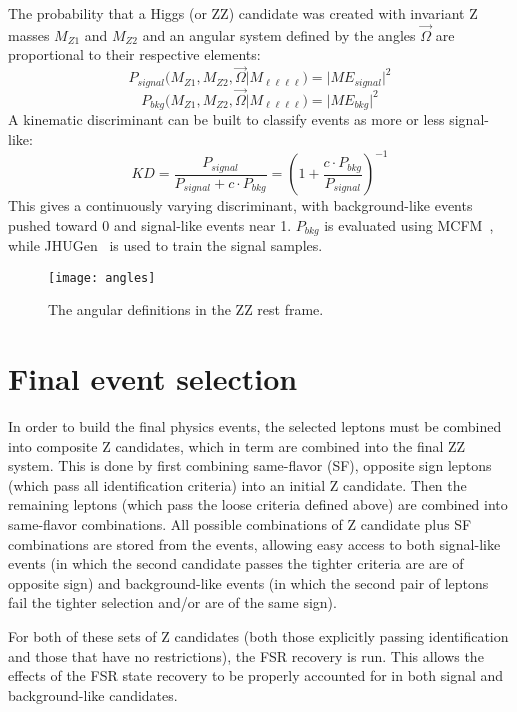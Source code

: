 The probability that a Higgs (or ZZ) candidate was created with invariant Z
masses $M_{Z1}$ and $M_{Z2}$ and an angular system defined by the angles $\vec
\Omega$ are proportional to their respective elements:
\begin{equation}
    P_{signal} (M_{Z1}, M_{Z2}, \vec \Omega | M_{\ell\ell\ell\ell} ) = |
    ME_{signal} |^2
\end{equation}
\begin{equation}
    P_{bkg} (M_{Z1}, M_{Z2}, \vec \Omega | M_{\ell\ell\ell\ell} ) = |
    ME_{bkg} |^2
\end{equation}
A kinematic discriminant can be built to classify events as more or less
signal-like:
\begin{equation}
    KD = \frac{P_{signal}}{P_{signal}+c\cdot P_{bkg}} = \left(1+\frac{c\cdot
    P_{bkg}}{P_{signal}} \right)^{-1}
\end{equation}
This gives a continuously varying discriminant, with background-like events
pushed toward 0 and signal-like events near 1.
$P_{bkg}$ is evaluated using MCFM~\cite{MCFM}, while JHUGen~\cite{spin} is used to train
the signal samples.

\begin{figure}[h]
\centering
\texttt{[image: angles]}
\caption[The angular definitions in the ZZ rest frame.]{The angular definitions
in the ZZ rest frame.}
\label{fig:angles}
\end{figure}

\section{Final event selection}
In order to build the final physics events, the selected leptons must be
combined into composite Z candidates, which in term are combined into the final
ZZ system. This is done by first combining same-flavor (SF), opposite sign leptons
(which pass all identification criteria) into an initial Z candidate. Then the
remaining leptons (which pass the loose criteria defined above) are combined
into same-flavor combinations. All possible combinations of Z candidate plus SF
combinations are stored from the events, allowing easy access to both
signal-like events (in which the second candidate passes the tighter criteria
are are of opposite sign) and background-like events (in which the second pair
of leptons fail the tighter selection and/or are of the same sign). 

For both of these sets of Z candidates (both those explicitly passing
identification and those that have no restrictions), the FSR recovery is run.
This allows the effects of the FSR state recovery to be properly accounted for
in both signal and background-like candidates. 

